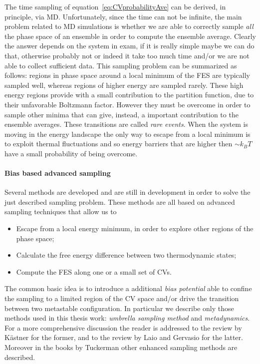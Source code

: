 The time sampling of equation~\eqref{eq:CVprobabilityAve} can be 
derived, in principle, via \ac{MD}. Unfortunately, since the time can not be infinite, the main problem related 
to \ac{MD} simulations is whether we are able to correctly sample \textit{all} the phase space of an ensemble in 
order to compute the ensemble average. Clearly the answer depends on the system in exam, if it is really simple 
maybe we can do that, otherwise probably not or indeed it take too much time and/or we are not able to collect 
sufficient data. This sampling problem can be summarized as follows: regions in phase space around a local 
minimum of the \ac{FES} are typically sampled well, whereas regions of higher energy are sampled rarely. These 
high energy regions provide with a small contribution to the partition function, due to their unfavorable 
Boltzmann factor. However they must be overcome in order to sample other minima that can give, instead, a 
important contribution to the ensemble averages. These transitions are called \textit{rare events}. When the 
system is moving in the energy landscape the only way to escape from a local minimum is to exploit thermal 
fluctuations and so energy barriers that are higher then $\sim k_B T$ have a small probability of being overcome. 

\paragraph{\textbf{Bias based advanced sampling}} Several methods are developed and are still in development in 
order to solve the just described sampling problem. These methods are all based on advanced sampling techniques 
that allow us to
\begin{itemize}
	\item Escape from a local energy minimum, in order to explore other regions of the phase space;
	\item Calculate the free energy difference between two thermodynamic states;
	\item Compute the \ac{FES} along one or a small set of \acp{CV}.
\end{itemize}
The common basic idea is to introduce a additional \textit{bias potential} able to confine the sampling to a 
limited region of the \ac{CV} space and/or drive the transition between two metastable configuration. In 
particular we describe only those methods used in this thesis work: \textit{umbrella sampling method} and 
\textit{metadynamics}. For a more comprehensive discussion the reader is addressed to the review by Kästner 
\cite{Umbrella} for the former, and to the review by Laio and Gervasio \cite{MetadReview} for the latter. 
Moreover in the books by Tuckerman \cite{Tuckerman} other enhanced sampling methods are described.

